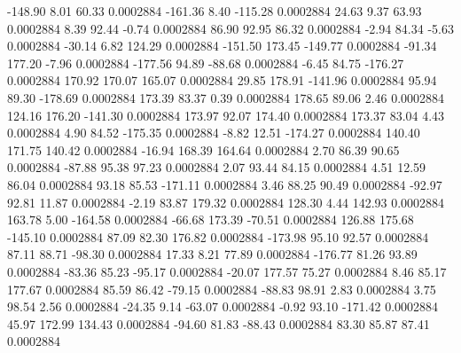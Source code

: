      -148.90        8.01       60.33     0.0002884
     -161.36        8.40     -115.28     0.0002884
       24.63        9.37       63.93     0.0002884
        8.39       92.44       -0.74     0.0002884
       86.90       92.95       86.32     0.0002884
       -2.94       84.34       -5.63     0.0002884
      -30.14        6.82      124.29     0.0002884
     -151.50      173.45     -149.77     0.0002884
      -91.34      177.20       -7.96     0.0002884
     -177.56       94.89      -88.68     0.0002884
       -6.45       84.75     -176.27     0.0002884
      170.92      170.07      165.07     0.0002884
       29.85      178.91     -141.96     0.0002884
       95.94       89.30     -178.69     0.0002884
      173.39       83.37        0.39     0.0002884
      178.65       89.06        2.46     0.0002884
      124.16      176.20     -141.30     0.0002884
      173.97       92.07      174.40     0.0002884
      173.37       83.04        4.43     0.0002884
        4.90       84.52     -175.35     0.0002884
       -8.82       12.51     -174.27     0.0002884
      140.40      171.75      140.42     0.0002884
      -16.94      168.39      164.64     0.0002884
        2.70       86.39       90.65     0.0002884
      -87.88       95.38       97.23     0.0002884
        2.07       93.44       84.15     0.0002884
        4.51       12.59       86.04     0.0002884
       93.18       85.53     -171.11     0.0002884
        3.46       88.25       90.49     0.0002884
      -92.97       92.81       11.87     0.0002884
       -2.19       83.87      179.32     0.0002884
      128.30        4.44      142.93     0.0002884
      163.78        5.00     -164.58     0.0002884
      -66.68      173.39      -70.51     0.0002884
      126.88      175.68     -145.10     0.0002884
       87.09       82.30      176.82     0.0002884
     -173.98       95.10       92.57     0.0002884
       87.11       88.71      -98.30     0.0002884
       17.33        8.21       77.89     0.0002884
     -176.77       81.26       93.89     0.0002884
      -83.36       85.23      -95.17     0.0002884
      -20.07      177.57       75.27     0.0002884
        8.46       85.17      177.67     0.0002884
       85.59       86.42      -79.15     0.0002884
      -88.83       98.91        2.83     0.0002884
        3.75       98.54        2.56     0.0002884
      -24.35        9.14      -63.07     0.0002884
       -0.92       93.10     -171.42     0.0002884
       45.97      172.99      134.43     0.0002884
      -94.60       81.83      -88.43     0.0002884
       83.30       85.87       87.41     0.0002884
